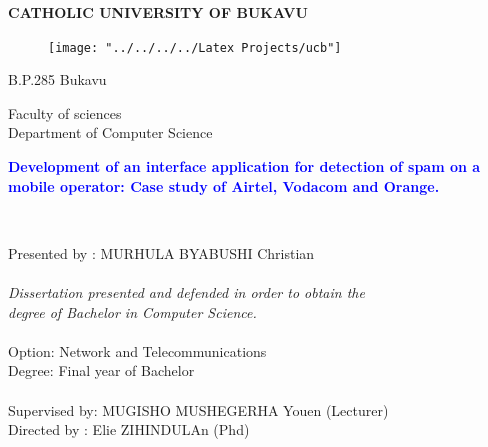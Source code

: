 \documentclass[12pt,a4paper, oneside]{book}
\begin{document}
 
	
	\begin{titlepage}
		\centering \Large \textbf{CATHOLIC UNIVERSITY OF BUKAVU}\\
		\begin{center}
			\begin{figure}[h]
				\centering
				\texttt{[image: "../../../../Latex Projects/ucb"]}
			\end{figure}
			\large{B.P.285 Bukavu}
		\end{center}
		\begin{center}
			\huge{\large{Faculty of sciences  }} \\
			{\Large \hspace*{0.7cm} Department of Computer Science}  
		\end{center}
		\hrulefill
		\begin{center}\bfseries\Large
			\textcolor{blue}{Development of an interface application for detection of spam on a mobile operator: Case study of Airtel, Vodacom and Orange.}\normalsize
		\end{center}
		\hrulefill \\
		
		\vspace{1\baselineskip}
		\normalsize 
			\begin {minipage}{0.5 \textwidth }	
		\begin{flushright}
			{	\vspace {0.1cm} 
				\begin{tabbing}					
					\hspace*{3.4cm}Presented by : \normalsize{MURHULA BYABUSHI Christian}  \\
					\\
					\hspace{3.4cm}\textit{Dissertation presented and defended in order to obtain the}\\
					\hspace{3.4cm}\textit{degree of Bachelor in Computer Science.}\\
					\vspace*{0.1cm}\\
					\hspace*{3.4					
						cm}Option: Network and Telecommunications\\					
					\hspace*{3.4cm}Degree: Final year of Bachelor\\ 
					\\
					\hspace*{3.4cm}Supervised by: MUGISHO MUSHEGERHA Youen (Lecturer) \\
					\hspace*{3.4cm}Directed by :  Elie ZIHINDULAn (Phd)
						

\end{tabbing}}
\end{flushright}
\end{minipage}
\end{titlepage}
\end{document}
